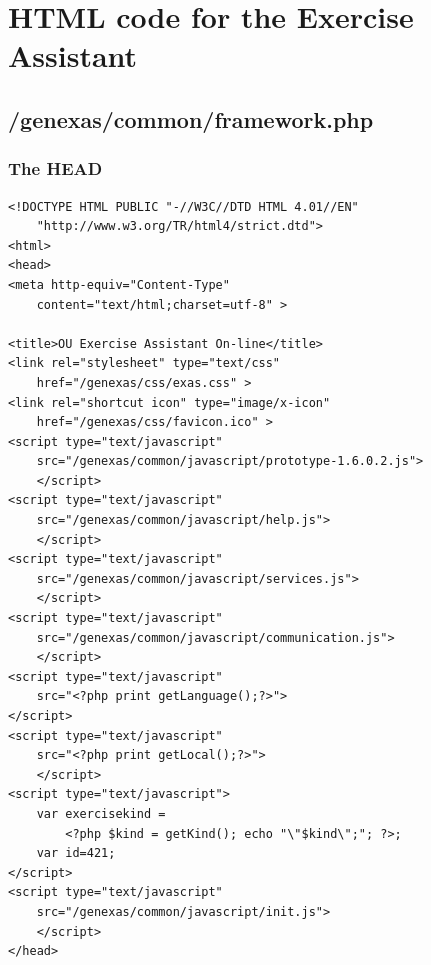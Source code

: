 \documentclass{article}
\begin{document}
\appendix
\section{HTML code for the Exercise Assistant}
\subsection{/genexas/common/framework.php}\label{appendix:framework}
\subsubsection{The HEAD}
\begin{verbatim}
<!DOCTYPE HTML PUBLIC "-//W3C//DTD HTML 4.01//EN"
    "http://www.w3.org/TR/html4/strict.dtd">
<html>
<head>
<meta http-equiv="Content-Type" 
    content="text/html;charset=utf-8" >

<title>OU Exercise Assistant On-line</title>
<link rel="stylesheet" type="text/css" 
    href="/genexas/css/exas.css" >
<link rel="shortcut icon" type="image/x-icon" 
    href="/genexas/css/favicon.ico" >
<script type="text/javascript" 
    src="/genexas/common/javascript/prototype-1.6.0.2.js">
    </script> 
<script type="text/javascript" 
    src="/genexas/common/javascript/help.js">
    </script>
<script type="text/javascript" 
    src="/genexas/common/javascript/services.js">
    </script>
<script type="text/javascript" 
    src="/genexas/common/javascript/communication.js">
    </script>
<script type="text/javascript" 
    src="<?php print getLanguage();?>">
</script>
<script type="text/javascript" 
    src="<?php print getLocal();?>">
    </script>
<script type="text/javascript">
    var exercisekind = 
        <?php $kind = getKind(); echo "\"$kind\";"; ?>; 
    var id=421;
</script>
<script type="text/javascript" 
    src="/genexas/common/javascript/init.js">
    </script>
</head>
\end{verbatim}
\end{document}
